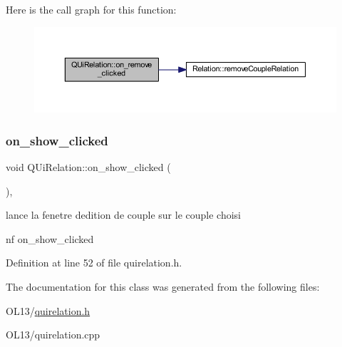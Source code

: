 Here is the call graph for this function\+:\nopagebreak
\begin{figure}[H]
\begin{center}
\leavevmode
\includegraphics[width=350pt]{class_q_ui_relation_a14fddadaa70fa8c82a0e49a547e2f6b5_cgraph}
\end{center}
\end{figure}
\mbox{\label{class_q_ui_relation_a66b413fb02bae1c7ce504395655cd47f}} 
\subsubsection{\texorpdfstring{on\+\_\+show\+\_\+clicked}{on\_show\_clicked}}
{\footnotesize\ttfamily void Q\+Ui\+Relation\+::on\+\_\+show\+\_\+clicked (\begin{DoxyParamCaption}{ }\end{DoxyParamCaption})\hspace{0.3cm}{\ttfamily [inline]}, {\ttfamily [slot]}}



lance la fenetre d\textquotesingle{}edition de couple sur le couple choisi 

nf on\+\_\+show\+\_\+clicked 

Definition at line 52 of file quirelation.\+h.



The documentation for this class was generated from the following files\+:\begin{DoxyCompactItemize}
\item 
O\+L13/\hyperlink{quirelation_8h}{quirelation.\+h}\item 
O\+L13/quirelation.\+cpp\end{DoxyCompactItemize}
